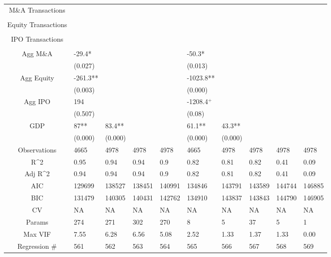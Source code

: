 \documentclass{article}
\begin{document}
\begin{table}[H]
\begin{tabular}{|clllllllll|}
  M\&A Transactions &  &  &  &  &  &  &  &  &  \\ 
   &  &  &  &  &  &  &  &  &  \\ 
  Equity Transactions &  &  &  &  &  &  &  &  &  \\ 
   &  &  &  &  &  &  &  &  &  \\ 
  IPO Transactions &  &  &  &  &  &  &  &  &  \\ 
   &  &  &  &  &  &  &  &  &  \\ 
  Agg M\&A & -29.4* &  &  &  & -50.3* &  &  &  &  \\ 
   & (0.027) &  &  &  & (0.013) &  &  &  &  \\ 
  Agg Equity & -261.3** &  &  &  & -1023.8** &  &  &  &  \\ 
   & (0.003) &  &  &  & (0.000) &  &  &  &  \\ 
  Agg IPO & 194 &  &  &  & -1208.4$^{+}$ &  &  &  &  \\ 
   & (0.507) &  &  &  & (0.08) &  &  &  &  \\ 
  GDP & 87** & 83.4** &  &  & 61.1** & 43.3** &  &  &  \\ 
   & (0.000) & (0.000) &  &  & (0.000) & (0.000) &  &  &  \\ 
  \hline 
 Observations & 4665 & 4978 & 4978 & 4978 & 4665 & 4978 & 4978 & 4978 & 4978 \\ 
  R^2 & 0.95 & 0.94 & 0.94 & 0.9 & 0.82 & 0.81 & 0.82 & 0.41 & 0.09 \\ 
  Adj R^2 & 0.94 & 0.94 & 0.94 & 0.9 & 0.82 & 0.81 & 0.82 & 0.41 & 0.09 \\ 
  AIC & 129699 & 138527 & 138451 & 140991 & 134846 & 143791 & 143589 & 144744 & 146885 \\ 
  BIC & 131479 & 140305 & 140431 & 142762 & 134910 & 143837 & 143843 & 144790 & 146905 \\ 
  CV & NA & NA & NA & NA & NA & NA & NA & NA & NA \\ 
  Params & 274 & 271 & 302 & 270 & 8 & 5 & 37 & 5 & 1 \\ 
  Max VIF & 7.55 & 6.28 & 6.56 & 5.08 & 2.52 & 1.33 & 1.37 & 1.33 & 0.00 \\ 
  Regression \# & 561 & 562 & 563 & 564 & 565 & 566 & 567 & 568 & 569 \\ 
   \hline
\end{tabular}
 
\end{table}
\end{document}
